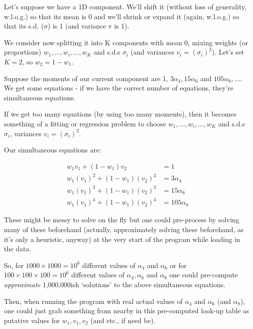 \documentclass{elsarticle}
\begin{document}
Let's suppose we have a 1D component.  We'll shift it (without loss of
generality, w.l.o.g.) so that its mean is 0 and we'll shrink or expand it
(again, w.l.o.g.) so that its s.d. ($\sigma$) is 1 (and variance v is 1).

We consider now splitting it into K components with mean 0,
mixing weights (or proportions) $w_1, ..., w_i, ..., w_K$ and s.d.s $\sigma_i$ (and variances $v_i = (\sigma_i)^2$).
Let's set $K = 2$, so $w_2 = 1 - w_1$.

Suppose the moments of our current component are 1, $3 \alpha_4, 15 \alpha_6$ and $105 \alpha_8, ... $.
We get some equations - if we have the correct number of equations,
they're simultaneous equations.

If we get too many equations (by using too many moments), then it
becomes something of a fitting or regression problem to choose
$w_1, ..., w_i, ..., w_K$ and s.d.s $\sigma_i$, variances $v_i = (\sigma_i)^2$.

Our simultaneous equations are:

\begin{align*}
w_1 v_1       + (1 - w_1) v_2       &=    1\\
w_1 (v_1)^2  + (1 - w_1) (v_2)^2  &=    3 \alpha_4\\
w_1 (v_1)^3  + (1 - w_1) (v_2)^3  &=   15 \alpha_6\\
w_1 (v_1)^4  + (1 - w_1) (v_2)^4  &=  105 \alpha_8
\end{align*}

These might be messy to solve on the fly  but one could pre-process by solving many of these beforehand (actually, approximately solving these beforehand, as it's only
a heuristic, anyway) at the very start of the program while loading in the data.

So, for $1000 \times 1000 = 10^6$ different values of $\alpha_4$ and $\alpha_6$
or for $100 \times 100 \times 100 = 10^6$ different values of $\alpha_4, \alpha_6$ and $\alpha_8$
one could pre-compute {\em approximate} 1,000,000ish `solutions' to the above simultaneous equations.

Then, when running the program with real actual values of $\alpha_4$ and $\alpha_6$ (and $\alpha_8$),
one could just grab something from nearby in this pre-computed look-up table
as putative values for $w_1, v_1, v_2$ (and etc., if need be).



\end{document}
